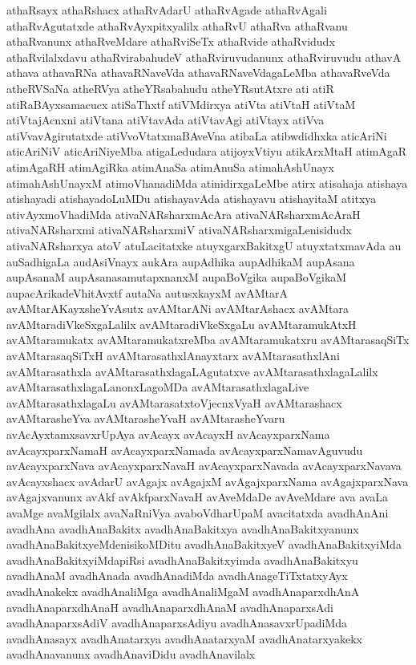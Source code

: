 {athaRsayx
athaRshacx
athaRvAdarU
athaRvAgade
athaRvAgali
athaRvAgutatxde
athaRvAyxpitxyalilx
athaRvU
athaRva
athaRvanu
athaRvanunx
athaRveMdare
athaRviSeTx
athaRvide
athaRvidudx
athaRvilalxdavu
athaRvirabahudeV
athaRviruvudanunx
athaRviruvudu
athavA
athava
athavaRNa
athavaRNaveVda
athavaRNaveVdagaLeMba
athavaRveVda
atheRVSaNa
atheRVya
atheYRsabahudu
atheYRsutAtxre
ati
atiR
atiRaBAyxsamacucx
atiSaThxtf
atiVMdirxya
atiVta
atiVtaH
atiVtaM
atiVtajAcnxni
atiVtana
atiVtavAda
atiVtavAgi
atiVtayx
atiVva
atiVvavAgirutatxde
atiVvoVtatxmaBAveVna
atibaLa
atibwdidhxka
aticAriNi
aticAriNiV
aticAriNiyeMba
atigaLedudara
atijoyxVtiyu
atikArxMtaH
atimAgaR
atimAgaRH
atimAgiRka
atimAnaSa
atimAnuSa
atimahAshUnayx
atimahAshUnayxM
atimoVhanadiMda
atinidirxgaLeMbe
atirx
atisahaja
atishaya
atishayadi
atishayadoLuMDu
atishayavAda
atishayavu
atishayitaM
atitxya
ativAyxmoVhadiMda
ativaNARsharxmAcAra
ativaNARsharxmAcAraH
ativaNARsharxmi
ativaNARsharxmiV
ativaNARsharxmigaLenisidudx
ativaNARsharxya
atoV
atuLacitatxke
atuyxgarxBakitxgU
atuyxtatxmavAda
au
auSadhigaLa
audAsiVnayx
aukAra
aupAdhika
aupAdhikaM
aupAsana
aupAsanaM
aupAsanasamutapxnanxM
aupaBoVgika
aupaBoVgikaM
aupacArikadeVhitAvxtf
autaNa
autusxkayxM
avAMtarA
avAMtarAKayxsheYvAsutx
avAMtarANi
avAMtarAshacx
avAMtara
avAMtaradiVkeSxgaLalilx
avAMtaradiVkeSxgaLu
avAMtaramukAtxH
avAMtaramukatx
avAMtaramukatxreMba
avAMtaramukatxru
avAMtarasaqSiTx
avAMtarasaqSiTxH
avAMtarasathxlAnayxtarx
avAMtarasathxlAni
avAMtarasathxla
avAMtarasathxlagaLAgutatxve
avAMtarasathxlagaLalilx
avAMtarasathxlagaLanonxLagoMDa
avAMtarasathxlagaLive
avAMtarasathxlagaLu
avAMtarasatxtoVjecnxVyaH
avAMtarashacx
avAMtarasheYva
avAMtarasheYvaH
avAMtarasheYvaru
avAcAyxtamxsavxrUpAya
avAcayx
avAcayxH
avAcayxparxNama
avAcayxparxNamaH
avAcayxparxNamada
avAcayxparxNamavAguvudu
avAcayxparxNava
avAcayxparxNavaH
avAcayxparxNavada
avAcayxparxNavava
avAcayxshacx
avAdarU
avAgajx
avAgajxM
avAgajxparxNama
avAgajxparxNava
avAgajxvanunx
avAkf
avAkfparxNavaH
avAveMdaDe
avAveMdare
ava
avaLa
avaMge
avaMgilalx
avaNaRniVya
avaboVdharUpaM
avacitatxda
avadhAnAni
avadhAna
avadhAnaBakitx
avadhAnaBakitxya
avadhAnaBakitxyanunx
avadhAnaBakitxyeMdenisikoMDitu
avadhAnaBakitxyeV
avadhAnaBakitxyiMda
avadhAnaBakitxyiMdapiRsi
avadhAnaBakitxyimda
avadhAnaBakitxyu
avadhAnaM
avadhAnada
avadhAnadiMda
avadhAnageTiTxtatxyAyx
avadhAnakekx
avadhAnaliMga
avadhAnaliMgaM
avadhAnaparxdhAnA
avadhAnaparxdhAnaH
avadhAnaparxdhAnaM
avadhAnaparxsAdi
avadhAnaparxsAdiV
avadhAnaparxsAdiyu
avadhAnasavxrUpadiMda
avadhAnasayx
avadhAnatarxya
avadhAnatarxyaM
avadhAnatarxyakekx
avadhAnavanunx
avadhAnaviDidu
avadhAnavilalx
}
